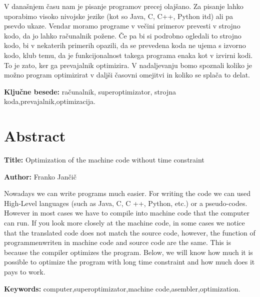\documentclass[a4paper, 12pt]{book}
\newcommand{\ttitleEn}{Optimization of the machine code without time constraint}
\newcommand{\tauthor}{Franko Jančič}
\newcommand{\tkeywords}{računalnik, superoptimizator, strojna koda,prevajalnik,optimizacija}
\newcommand{\tkeywordsEn}{computer,superoptimizator,machine code,asembler,optimization}
\newcommand{\clearemptydoublepage}{\newpage{\pagestyle{empty}\cleardoublepage}}
\begin{document}
\noindent 
V današnjem času nam je pisanje programov precej olajšano. Za pisanje lahko uporabimo visoko nivojske jezike (kot so Java, C, C++, Python itd) ali pa psevdo ukaze. Vendar moramo programe v večini primerov prevesti v strojno kodo, da jo lahko računalnik požene. Če pa bi si podrobno ogledali to strojno kodo, bi v nekaterih primerih opazili, da se prevedena koda ne ujema s izvorno kodo, klub temu, da je funkcijonalnost takega programa enaka kot v izvirni kodi. To je zato, ker ga prevajalnik optimizira. V nadaljevanju bomo spoznali koliko je možno program optimizirat v daljši časovni omejitvi in koliko se splača to delat.
\bigskip

\noindent\textbf{Ključne besede:} \tkeywords.
\clearemptydoublepage

\chapter*{Abstract}

\noindent\textbf{Title:} \ttitleEn
\bigskip

\noindent\textbf{Author:} \tauthor
\bigskip

\noindent Nowadays we can write programs much easier. For writing the code we can used High-Level languages (such as Java, C, C ++, Python, etc.) or a pseudo-codes. However in most cases we have to compile into machine code that the computer can run. If you look more closely at the machine code, in some cases we notice that the translated code does not match the source code, however, the function of programmenwriten in machine code and source code are the same. This is because the compiler optimizes the program. Below, we will know how much it is possible to optimize the program with long time constraint and how much does it pays to work.
\bigskip

\noindent\textbf{Keywords:} \tkeywordsEn.
\clearemptydoublepage

\mainmatter
\setcounter{page}{1}
\pagestyle{fancy}
\end{document}
